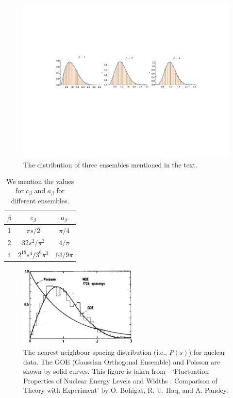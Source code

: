 \documentclass[letter,11pt]{article}
\begin{document}
\begin{figure}[htbp] 
	\centering 
	\includegraphics[width=1.05\textwidth]{figs/ensem.pdf}
	\caption{\label{fig:ensem1}The distribution of three ensembles mentioned in the text.}
\end{figure}


\begin{table}[h!]
	\centering
	\begin{tabular}{||c c c||} 
		\hline
		$\beta$ & $c_{\beta}$ & $a_{\beta}$ \\ [0.5ex] 
		\hline\hline
		1 & $\pi s/2$ & $\pi/4$  \\ 
		2 & $32 s^2/\pi^2$ & $4/\pi$  \\
		4 & $2^{18} s^4/3^6 \pi^3$ & $64/9\pi$
		 \\ [1ex] 
		\hline 
	\end{tabular}
\caption{We mention the values for $c_{\beta}$ and $a_{\beta}$ for different ensembles.}
\label{table:c_and_a}
\end{table}


\begin{figure}[htbp] 
	\centering 
	\includegraphics[width=0.55\textwidth]{figs/data_exp.png}
	\caption{\label{fig:data_exp1}The nearest neighbour spacing distribution (i.e., $P(s)$) 
	for nuclear data. The GOE (Gaussian Orthogonal Ensemble) and Poisson are shown 
	by solid curves. This figure is taken from - `Fluctuation Properties of Nuclear Energy 
	Levels and Widths : Comparison of Theory with Experiment' by O. Bohigas, R. U. 
	Haq, and A. Pandey.}
\end{figure}
\end{document}

